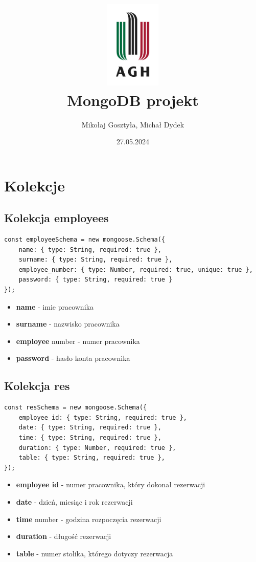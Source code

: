 \documentclass[12pt]{article}
\title{\includegraphics[width=0.2\textwidth]{agh.jpg} \\ \textbf{MongoDB projekt}}
\author{Mikołaj Gosztyła, Michał Dydek}
\date{27.05.2024}
\begin{document}
\maketitle

\hypersetup{
    linktoc=all
}
\tableofcontents
\newpage

\section{Kolekcje}

\begin{samepage}
\subsection{Kolekcja employees}
\begin{lstlisting}[caption={Employees}]
const employeeSchema = new mongoose.Schema({
    name: { type: String, required: true },
    surname: { type: String, required: true },
    employee_number: { type: Number, required: true, unique: true },
    password: { type: String, required: true }
});
\end{lstlisting}
\end{samepage}

\begin{itemize}
	\item \textbf{name} - imie pracownika
	\item \textbf{surname} - nazwisko pracownika
	\item \textbf{employee} number - numer pracownika
	\item \textbf{password} - hasło konta pracownika
\end{itemize}

\newpage
\begin{samepage}
\subsection{Kolekcja res}
\begin{lstlisting}[caption={Reservations}]
const resSchema = new mongoose.Schema({
    employee_id: { type: String, required: true },
    date: { type: String, required: true },
    time: { type: String, required: true },
    duration: { type: Number, required: true },
    table: { type: String, required: true },
});
\end{lstlisting}
\end{samepage}

\begin{itemize}
	\item \textbf{employee id} - numer pracownika, który dokonał rezerwacji
	\item \textbf{date} - dzień, miesiąc i rok rezerwacji
	\item \textbf{time} number - godzina rozpoczęcia rezerwacji
	\item \textbf{duration} - długość rezerwacji
	\item \textbf{table} - numer stolika, którego dotyczy rezerwacja
\end{itemize}
\end{document}
